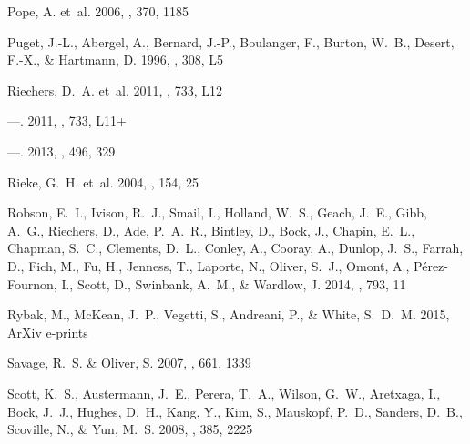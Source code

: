 \documentclass[iop]{emulateapj}
\begin{document}
\begin{thebibliography}{106}
{Pope}, A. {et~al.} 2006, \mnras, 370, 1185

{Puget}, J.-L., {Abergel}, A., {Bernard}, J.-P., {Boulanger}, F., {Burton},
  W.~B., {Desert}, F.-X., \& {Hartmann}, D. 1996, \aap, 308, L5

{Riechers}, D.~A. {et~al.} 2011{}, \apjl, 733, L12

---. 2011{}, \apjl, 733, L11+

---. 2013, \nat, 496, 329

{Rieke}, G.~H. {et~al.} 2004, \apjs, 154, 25

{Robson}, E.~I., {Ivison}, R.~J., {Smail}, I., {Holland}, W.~S., {Geach},
  J.~E., {Gibb}, A.~G., {Riechers}, D., {Ade}, P.~A.~R., {Bintley}, D., {Bock},
  J., {Chapin}, E.~L., {Chapman}, S.~C., {Clements}, D.~L., {Conley}, A.,
  {Cooray}, A., {Dunlop}, J.~S., {Farrah}, D., {Fich}, M., {Fu}, H., {Jenness},
  T., {Laporte}, N., {Oliver}, S.~J., {Omont}, A., {P{\'e}rez-Fournon}, I.,
  {Scott}, D., {Swinbank}, A.~M., \& {Wardlow}, J. 2014, \apj, 793, 11

{Rybak}, M., {McKean}, J.~P., {Vegetti}, S., {Andreani}, P., \& {White},
  S.~D.~M. 2015, ArXiv e-prints

{Savage}, R.~S. \& {Oliver}, S. 2007, \apj, 661, 1339

{Scott}, K.~S., {Austermann}, J.~E., {Perera}, T.~A., {Wilson}, G.~W.,
  {Aretxaga}, I., {Bock}, J.~J., {Hughes}, D.~H., {Kang}, Y., {Kim}, S.,
  {Mauskopf}, P.~D., {Sanders}, D.~B., {Scoville}, N., \& {Yun}, M.~S. 2008,
  \mnras, 385, 2225


\end{thebibliography}
\end{document}
